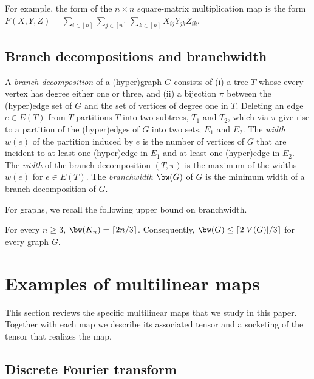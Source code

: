 For example, the form of the $n \times n$ square-matrix multiplication
map is the form $F(X, Y, Z) = \sum_{i \in [n]} \sum_{j \in [n]}
\sum_{k \in [n]} X_{ij}Y_{jk}Z_{ik}$.

\subsection{Branch decompositions and branchwidth}

A \emph{branch decomposition} of a (hyper)graph $G$ consists of
(i) a tree $T$ whose every vertex has degree either one or three, and
(ii) a bijection $\pi$ between the (hyper)edge set of $G$ and the set of
vertices of degree one in $T$. Deleting an edge $e\in E(T)$ from $T$
partitions $T$ into two subtrees, %
 $T_1$ and $T_2$, which via $\pi$
%
give rise  %
to a partition of the (hyper)edges of $G$ into
two sets,  %
$E_1$ and $E_2$.
The \emph{width} $w(e)$
of the partition induced by $e$ is the number of vertices of $G$ that are
incident to at least one (hyper)edge in $E_1$ and at least one (hyper)edge
in $E_2$. The \emph{width} of the branch decomposition $(T,\pi)$ is the maximum
of the widths $w(e)$ for $e\in E(T)$. The \emph{branchwidth} $\bw(G)$ of $G$
is the minimum width of a branch decomposition of $G$.

For graphs, we recall the following upper bound on branchwidth.

\begin{claim}
  For every $n \ge 3$, $\bw(K_n) = \lceil 2n/3 \rceil$.  Consequently, $\bw(G) \le \lceil 2 |V(G)|/3 \rceil$ for every graph $G$.
\end{claim}






\section{Examples of multilinear maps}
\label{sect:examples}

This section reviews the specific multilinear maps that we study in this
%
paper.  %
Together with each map we describe its associated
tensor and a socketing of the tensor that realizes the map.

\subsection{Discrete Fourier transform}

\label{sect:dft}


